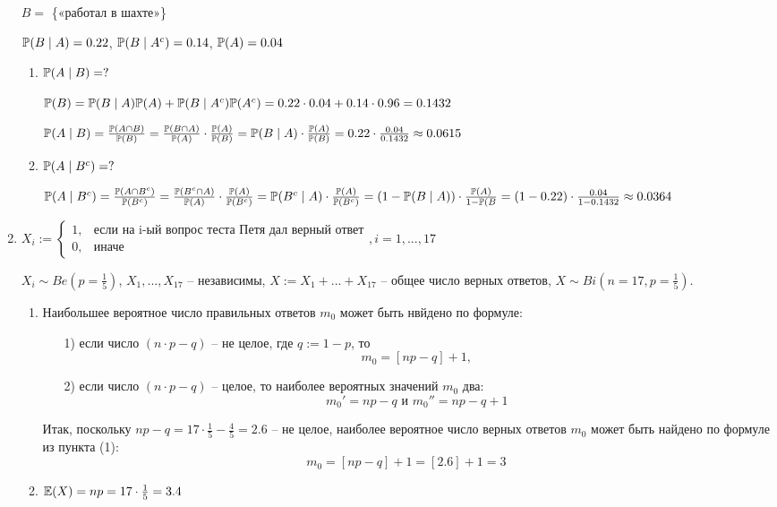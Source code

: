 \documentclass[12pt, a4paper]{article}\usepackage[]{graphicx}\usepackage[]{color}
\begin{document}
\begin{enumerate}
							$B=$ \{«работал в шахте»\}

							$\P (B \mid A) = 0.22$, $\P (B \mid A^c) = 0.14$, $\P (A) = 0.04$
							\begin{enumerate}
								\item $\P(A\mid B) = ?$

								$\P (B) = \P (B \mid A) \P(A) + \P (B \mid A^c) \P (A^c) = 0.22 \cdot 0.04 + 0.14 \cdot 0.96 = 0.1432$

								$\P(A \mid B) = \frac{\P(A\cap B)}{\P (B)} = \frac{\P (B \cap A)}{\P(A)} \cdot \frac{\P(A)}{\P (B)} = \P (B \mid A) \cdot \frac{\P(A)}{\P (B)} = 0.22 \cdot \frac{0.04}{0.1432} \approx 0.0615$

								\item $\P (A \mid B^c) = ? $

								$\P  (A \mid B^c) =  \frac{\P(A\cap B^c)}{\P (B^c)} =  \frac{\P (B^c \cap A)}{\P(A)} \cdot \frac{\P(A)}{\P (B^c)} = \P (B^c \mid A) \cdot \frac{\P(A)}{\P (B^c)} = (1-\P (B \mid A)) \cdot \frac{\P(A)}{1-\P (B} = (1-0.22) \cdot \frac{0.04}{1-0.1432} \approx 0.0364 $
							\end{enumerate}
							\item $X_i :=
							\begin{cases}
							1, & \text{если на i-ый вопрос теста Петя дал верный ответ} \\
							0, & \text{иначе}
							\end{cases}, 
							i = 1, ..., 17
							$

							$X_i \sim Be\left(p=\frac{1}{5}\right)$, $X_1, ..., X_{17}$ – независимы, $X:= X_1 + ... + X_{17}$ – общее число верных ответов, $X \sim Bi\left(n=17, p=\frac{1}{5}\right)$.
							\begin{enumerate}
								\item Наибольшее вероятное число правильных ответов $m_0$ может быть нвйдено по формуле:
								\begin{enumerate}
									\item[1)] если число $(n\cdot p - q)$ – не целое, где $q:=1-p$, то
									\[
									m_0 = [np-q] +1,
									\]
									\item[2)] если число  $(n\cdot p - q)$ – целое, то наиболее вероятных значений $m_0$ два:
									\[
									m_0' = np-q \text{ и } m_0'' = np-q+1
									\]
								\end{enumerate}
								Итак, поскольку $np-q = 17\cdot\frac{1}{5} - \frac{4}{5} = 2.6$ – не целое, наиболее вероятное число верных ответов $m_0$ может быть найдено по формуле из пункта (1):
								\[
								m_0 = [np-q] +1 = [2.6] + 1 = 3
								\]
								\item $\E(X) = np = 17 \cdot \frac{1}{5}=3.4$


\end{enumerate}
\end{enumerate}
\end{document}
